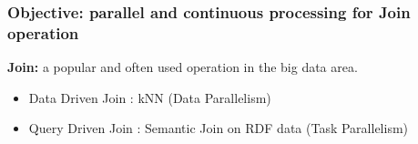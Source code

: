 \begin{frame}
\frametitle{Objective: parallel and continuous processing for Join operation}
\textbf{Join: } a popular and often used operation in the big data area.

\begin{itemize}
\item Data Driven Join : kNN (Data Parallelism)
\item Query Driven Join : Semantic Join on RDF data (Task Parallelism)
\end{itemize} 

\end{frame}